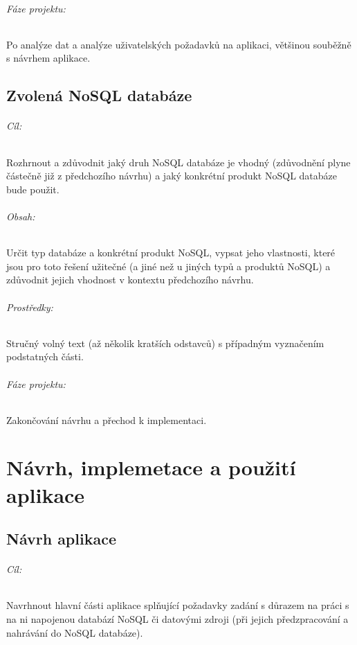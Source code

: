 \documentclass[10pt,xcolor=pdflatex,dvipsnames,table,oneside]{book}
\begin{document}
\paragraph{Fáze projektu:}
Po analýze dat a analýze uživatelských požadavků na aplikaci, většinou souběžně s návrhem aplikace.

\chapter{Zvolená NoSQL databáze}

\paragraph{Cíl:}
Rozhrnout a zdůvodnit jaký druh NoSQL databáze je vhodný (zdůvodnění plyne částečně již z předchozího návrhu) a jaký konkrétní produkt NoSQL databáze bude použit.

\paragraph{Obsah:}
Určit typ databáze a konkrétní produkt NoSQL, vypsat jeho vlastnosti,
které jsou pro toto řešení užitečné (a jiné než u jiných typů a produktů NoSQL)
a zdůvodnit jejich vhodnost v kontextu předchozího návrhu.

\paragraph{Prostředky:}
Stručný volný text (až několik kratších odstavců) s případným vyznačením podstatných části.

\paragraph{Fáze projektu:}
Zakončování návrhu a přechod k implementaci.

\part{Návrh, implemetace a použití aplikace}

\chapter{Návrh aplikace}

\paragraph{Cíl:}
Navrhnout hlavní části aplikace splňující požadavky zadání s důrazem na práci s na ni napojenou databází NoSQL či datovými zdroji
(při jejich předzpracování a nahrávání do NoSQL databáze).
\end{document}

